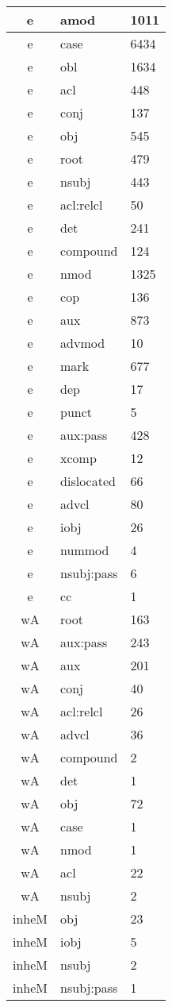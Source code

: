 \documentclass[a4 paper]{article}
\begin{document}
\begin{longtable}{cp{}p{}}
e & amod & 1011\\ \midrule e & case & 6434\\ \midrule e & obl & 1634\\ \midrule e & acl & 448\\ \midrule e & conj & 137\\ \midrule e & obj & 545\\ \midrule e & root & 479\\ \midrule e & nsubj & 443\\ \midrule e & acl:relcl & 50\\ \midrule e & det & 241\\ \midrule e & compound & 124\\ \midrule e & nmod & 1325\\ \midrule e & cop & 136\\ \midrule e & aux & 873\\ \midrule e & advmod & 10\\ \midrule e & mark & 677\\ \midrule e & dep & 17\\ \midrule e & punct & 5\\ \midrule e & aux:pass & 428\\ \midrule e & xcomp & 12\\ \midrule e & dislocated & 66\\ \midrule e & advcl & 80\\ \midrule e & iobj & 26\\ \midrule e & nummod & 4\\ \midrule e & nsubj:pass & 6\\ \midrule e & cc & 1\\ \midrule 
wA & root & 163\\ \midrule wA & aux:pass & 243\\ \midrule wA & aux & 201\\ \midrule wA & conj & 40\\ \midrule wA & acl:relcl & 26\\ \midrule wA & advcl & 36\\ \midrule wA & compound & 2\\ \midrule wA & det & 1\\ \midrule wA & obj & 72\\ \midrule wA & case & 1\\ \midrule wA & nmod & 1\\ \midrule wA & acl & 22\\ \midrule wA & nsubj & 2\\ \midrule 
inheM & obj & 23\\ \midrule inheM & iobj & 5\\ \midrule inheM & nsubj & 2\\ \midrule inheM & nsubj:pass & 1\\ \midrule 

\end{longtable}
\end{document}
